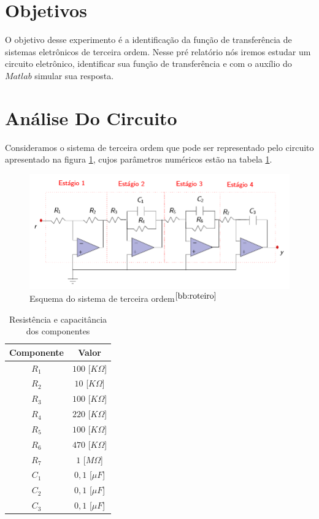 \documentclass{article}
\begin{document}


\onehalfspacing
\section{Objetivos} 
O objetivo desse experimento é a identificação da função de transferência de sistemas eletrônicos de terceira ordem. Nesse pré relatório nós iremos estudar um circuito eletrônico, identificar sua função de transferência e com o auxílio do $Matlab$ simular sua resposta. 
	
\section{Análise Do Circuito}
Consideramos o sistema de terceira ordem que pode ser representado pelo circuito apresentado na figura \ref{fig:circuito}, cujos parâmetros numéricos estão na tabela \ref{tab:valores}.

\begin{figure}[H]
\centering
\includegraphics[width=0.7\linewidth]{CircuitoPlanta}
\caption{Esquema do sistema de terceira ordem$^{\cite{bb:roteiro}}$}
\label{fig:circuito}
\end{figure}

\begin{table}[H]
\centering
\caption{Resistência e capacitância dos componentes}
\label{tab:valores}
\begin{tabular}{|c|c|}
	\hline Componente & Valor \\ 
	\hline $R_1$ & $100$ [$K\Omega$] \\ 
	\hline $R_2$ & $10$ [$K\Omega$] \\ 
	\hline $R_3$ & $100$ [$K\Omega$] \\ 
	\hline $R_4$ & $220$ [$K\Omega$] \\ 
	\hline $R_5$ & $100$ [$K\Omega$] \\ 
	\hline $R_6$ & $470$ [$K\Omega$] \\ 
	\hline $R_7$ & $1$ [$M\Omega$] \\ 	
	\hline $C_1$ & $0,1$ [$\mu F$] \\ 	
	\hline $C_2$ & $0,1$ [$\mu F$] \\ 	
	\hline $C_3$ & $0,1$ [$\mu F$] \\ 	
	\hline 
\end{tabular} 
\end{table}
\end{document}
